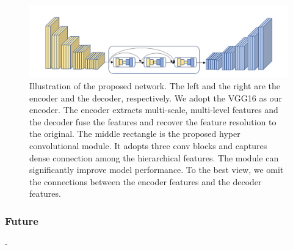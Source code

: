 \documentclass[a4paper, 10pt]{article}
\begin{document}
			\begin{figure}[htbp]
				\centering 
				\includegraphics[width=\columnwidth]{picture/Edge Detection/DSCD proposed network}
				\captionsetup{font=scriptsize}
				\caption{
					\label{fig: DSCD proposed network} 
					Illustration of the proposed network. The left and the right are the encoder and the decoder, respectively. We adopt
					the VGG16 as our encoder. The encoder extracts multi-scale, multi-level features and the decoder fuse the features and recover the feature resolution to the original. The middle rectangle is the proposed hyper convolutional module. It adopts three conv blocks and captures dense connection among the hierarchical features. The module can significantly improve model
					performance. To the best view, we omit the connections between the encoder features and the decoder features.
				}
			\end{figure}
			
			
			\subsubsection{Future}
			-
		
		\renewcommand{\refname}{References}
		
		
			
			
			
			
			
			
		
		
		
		
		
	
\end{document}
